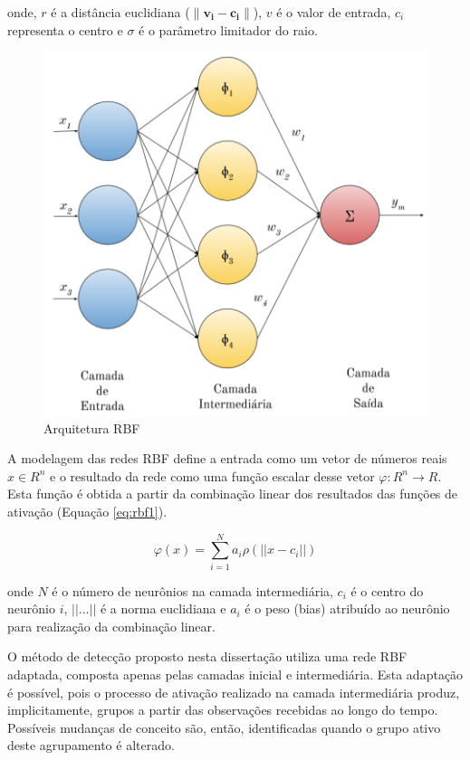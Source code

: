 \documentclass[msc, classic, a4paper]{ufbathesis}
\begin{document}
onde, $r$ é a distância euclidiana ($\|\mathbf {v_{i}} - \mathbf {c_{i}}\|$), $v$ é o valor de entrada, $c_i$ representa o centro e $\sigma$ é o parâmetro limitador do raio.

\begin{figure}[H]
\begin{center}
    \includegraphics[scale=1]{imagens/rbf_arq.png}
    \caption{Arquitetura RBF}
    \label{fig:rbg_arq}
\end{center}
\end{figure}

A modelagem das redes RBF define a entrada como um vetor de números reais ${x} \in {R} ^{n}$ e o resultado da rede como uma função escalar desse vetor $\varphi : {R} ^{n} \to {R}$.
Esta função é obtida a partir da combinação linear dos resultados das funções de ativação (Equação \ref{eq:rbf1}).

\begin{equation} \label{eq:rbf1}
    \varphi ({x})=\sum _{{i=1}}^{N}a_{i}\rho (||{x}-{c}_{i}||)
\end{equation}

onde $N$ é o número de neurônios na camada intermediária, ${c}_{i}$ é o centro do neurônio $i$, $||\ldots||$ é a norma euclidiana e $a_{i}$ é o peso (bias) atribuído ao neurônio para realização da combinação linear.

O método de detecção proposto nesta dissertação utiliza uma rede RBF adaptada, composta apenas pelas camadas inicial e intermediária.
Esta adaptação é possível, pois o processo de ativação realizado na camada intermediária produz, implicitamente, grupos a partir das observações recebidas ao longo do tempo.
Possíveis mudanças de conceito são, então, identificadas quando o grupo ativo deste agrupamento é alterado.
\end{document}
